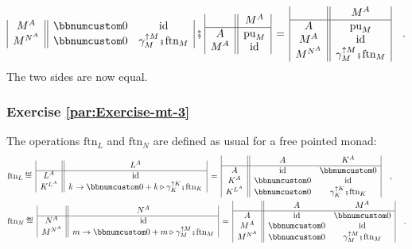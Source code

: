 \begin{align*}
\begin{array}{|c||cc|}
M^{A} & \bbnum 0 & \text{id}\\
M^{N^{A}} & \bbnum 0 & \gamma_{M}^{\uparrow M}\bef\text{ftn}_{M}
\end{array}\,\bef\,\begin{array}{|c||c|}
 & M^{A}\\
\hline A & \text{pu}_{M}\\
M^{A} & \text{id}
\end{array}\,=\,\begin{array}{|c||c|}
 & M^{A}\\
\hline A & \text{pu}_{M}\\
M^{A} & \text{id}\\
M^{N^{A}} & \gamma_{M}^{\uparrow M}\bef\text{ftn}_{M}
\end{array}\quad.
\end{align*}
The two sides are now equal.

\subsubsection*{Exercise \ref{par:Exercise-mt-3}}

The operations $\text{ftn}_{L}$ and $\text{ftn}_{N}$ are defined
as usual for a free pointed monad:
\begin{align*}
 & \text{ftn}_{L}\triangleq\,\begin{array}{|c||c|}
 & L^{A}\\
\hline L^{A} & \text{id}\\
K^{L^{A}} & k\rightarrow\bbnum 0+k\triangleright\gamma_{K}^{\uparrow K}\bef\text{ftn}_{K}
\end{array}\,=\,\begin{array}{|c||cc|}
 & A & K^{A}\\
\hline A & \text{id} & \bbnum 0\\
K^{A} & \bbnum 0 & \text{id}\\
K^{L^{A}} & \bbnum 0 & \gamma_{K}^{\uparrow K}\bef\text{ftn}_{K}
\end{array}\quad,\\
 & \text{ftn}_{N}\triangleq\,\begin{array}{|c||c|}
 & N^{A}\\
\hline N^{A} & \text{id}\\
M^{N^{A}} & m\rightarrow\bbnum 0+m\triangleright\gamma_{M}^{\uparrow M}\bef\text{ftn}_{M}
\end{array}\,=\,\begin{array}{|c||cc|}
 & A & M^{A}\\
\hline A & \text{id} & \bbnum 0\\
M^{A} & \bbnum 0 & \text{id}\\
M^{N^{A}} & \bbnum 0 & \gamma_{M}^{\uparrow M}\bef\text{ftn}_{M}
\end{array}\quad.
\end{align*}

